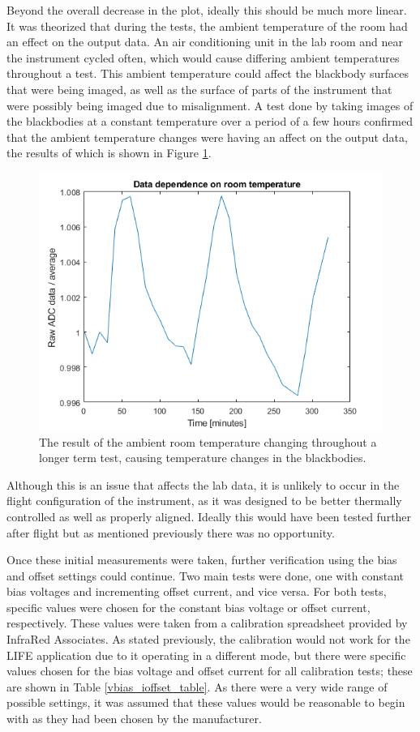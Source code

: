 Beyond the overall decrease in the plot, ideally this should be much more linear. It was theorized that during the tests, the ambient temperature of the room had an effect on the output data. An air conditioning unit in the lab room and near the instrument cycled often, which would cause differing ambient temperatures throughout a test. This ambient temperature could affect the blackbody surfaces that were being imaged, as well as the surface of parts of the instrument that were possibly being imaged due to misalignment. A test done by taking images of the blackbodies at a constant temperature over a period of a few hours confirmed that the ambient temperature changes were having an affect on the output data, the results of which is shown in Figure \ref{fig:ADC_dep_on_room_temp}.

\begin{figure}[h]
  \centering
  \includegraphics[width=0.8\linewidth]{chap5_images/DC_dep_on_room_temp.png}
  \caption{The result of the ambient room temperature changing throughout a longer term test, causing temperature changes in the blackbodies.}
  \label{fig:ADC_dep_on_room_temp}
\end{figure}

Although this is an issue that affects the lab data, it is unlikely to occur in the flight configuration of the instrument, as it was designed to be better thermally controlled as well as properly aligned. Ideally this would have been tested further after flight but as mentioned previously there was no opportunity. 

Once these initial measurements were taken, further verification using the bias and offset settings could continue. Two main tests were done, one with constant bias voltages and incrementing offset current, and vice versa. For both tests, specific values were chosen for the constant bias voltage or offset current, respectively. These values were taken from a calibration spreadsheet provided by InfraRed Associates. As stated previously, the calibration would not work for the LIFE application due to it operating in a different mode, but there were specific values chosen for the bias voltage and offset current for all calibration tests; these are shown in Table \ref{vbias_ioffset_table}. As there were a very wide range of possible settings, it was assumed that these values would be reasonable to begin with as they had been chosen by the manufacturer. 

